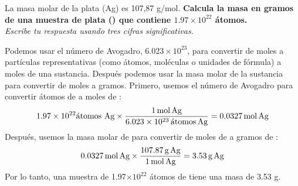 La masa molar de la plata (Ag) es 107,87 g/mol.
\textbf{Calcula la masa en gramos de una muestra de plata () que contiene $1.97 \times 10^{22}$ átomos.}\\
\emph{Escribe tu respuesta usando tres cifras significativas.}

\begin{solutionbox}{6cm}
    Podemos usar el número de Avogadro, $6.023\times 10^{23}$, para convertir de moles a partículas representativas (como átomos, moléculas o unidades de fórmula) a moles de una sustancia. Después podemos usar la masa molar de la sustancia para convertir de moles a gramos.
    Primero, usemos el número de Avogadro para convertir átomos de  a moles de :
    \[1.97\times 10^{22} \text{átomos Ag}\times\frac{1\,\text{mol\,Ag}}{6.023\times 10^{23}\,\text{átomos\,Ag}}=0.0327\,\text{mol\,Ag} \]
    Después, usemos la masa molar de  para convertir de moles de  a gramos de :
    \[0.0327\,\text{mol\,Ag}\times\frac{107.87\,\text{g\,Ag}}{1\,\text{mol\,Ag}}=3.53\,\text{g\,Ag} \]
    Por lo tanto, una muestra de 1.97$\times 10^{22}$ átomos de  tiene una masa de 3.53 g.
\end{solutionbox}